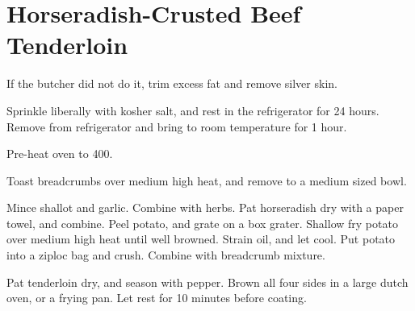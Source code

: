 \section{Horseradish-Crusted Beef Tenderloin}
\begin{recipe}



If the butcher did not do it, trim excess fat and remove silver skin. 

Sprinkle liberally with kosher salt, and rest in the refrigerator for 24 hours. Remove from refrigerator
and bring to room temperature for 1 hour. 

Pre-heat oven to 400\degree{}.


Toast breadcrumbs over medium high heat, and remove to a medium sized bowl.


Mince shallot and garlic. Combine with herbs. Pat horseradish dry with a paper towel, and combine. Peel 
potato, and grate on a box grater. Shallow fry potato over medium high heat until well browned. Strain oil, 
and let cool. Put potato into a ziploc bag and crush. Combine with breadcrumb mixture. 

Pat tenderloin dry, and season with pepper. Brown all four sides in a large dutch oven, or a frying pan. 
Let rest for 10 minutes before coating. 



\end{recipe}

